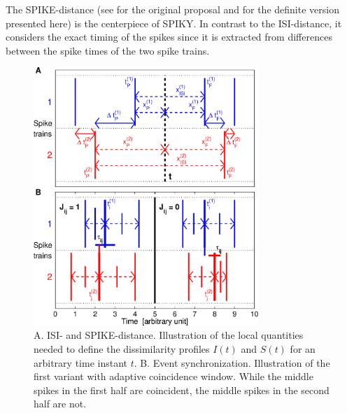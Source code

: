 \documentclass[10pt,twocolumn]{elsart5p}
\begin{document}
The SPIKE-distance (see \citet{Kreuz11} for the original proposal and \citet{Kreuz13, Kreuz12} for the definite version presented here) is the centerpiece of SPIKY. In contrast to the ISI-distance, it considers the exact timing of the spikes since it is extracted from differences between the spike times of the two spike trains. 
%
%
\begin{figure}
    \includegraphics[width=85mm]{ISI_SPIKE_ES_ILLU.eps}
    \caption{\abb\label{fig:ISI-SPIKE-ES-Illustration} A.  ISI- and SPIKE-distance. Illustration of the local quantities needed to define the dissimilarity profiles $I (t)$ and $S (t)$ for an arbitrary time instant $t$.    B. Event synchronization. Illustration of the first variant with adaptive coincidence window. While the middle spikes in the first half are coincident, the middle spikes in the second half are not.}
\end{figure}
%
\end{document}
